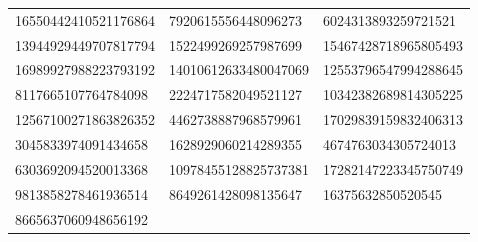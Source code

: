 \begin{longtable}{*{3}{l}}
16550442410521176864&7920615556448096273&6024313893259721521\\
13944929449707817794&1522499269257987699&15467428718965805493\\
16989927988223793192&14010612633480047069&12553796547994288645\\
8117665107764784098&2224717582049521127&10342382689814305225\\
12567100271863826352&4462738887968579961&17029839159832406313\\
3045833974091434658&1628929060214289355&4674763034305724013\\
6303692094520013368&10978455128825737381&17282147223345750749\\
9813858278461936514&8649261428098135647&16375632850520545\\
8665637060948656192&\\
\bottomrule\end{longtable}
